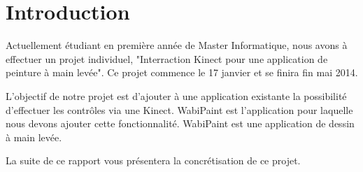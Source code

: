 \chapter{Introduction}
Actuellement étudiant en première année de Master Informatique, nous avons à effectuer un projet individuel, "Interraction Kinect pour une application de peinture à main levée". Ce projet commence le 17 janvier et se finira fin mai 2014.

L'objectif de notre projet est d'ajouter à une application existante la possibilité d'effectuer les contrôles via une Kinect. WabiPaint est l'application pour laquelle nous devons ajouter cette fonctionnalité. WabiPaint est une application de dessin à main levée.

La suite de ce rapport vous présentera la concrétisation de ce projet.

